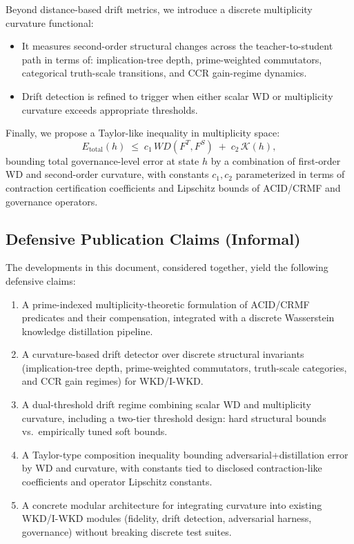 \documentclass[11pt]{article}
\theoremstyle{definition}
\theoremstyle{plain}
\theoremstyle{remark}
\begin{document}
Beyond distance-based drift metrics, we introduce a discrete multiplicity curvature functional:
\begin{itemize}[leftmargin=2em]
  \item It measures second-order structural changes across the teacher-to-student path in terms of: implication-tree depth, prime-weighted commutators, categorical truth-scale transitions, and CCR gain-regime dynamics.
  \item Drift detection is refined to trigger when either scalar WD or multiplicity curvature exceeds appropriate thresholds.
\end{itemize}

Finally, we propose a Taylor-like inequality in multiplicity space:
\[
  E_{\text{total}}(h) \;\le\; c_1 \, WD(F^T,F^S) \;+\; c_2 \, \mathcal{K}(h),
\]
bounding total governance-level error at state \(h\) by a combination of first-order WD and second-order curvature, with constants \(c_1,c_2\) parameterized in terms of contraction certification coefficients and Lipschitz bounds of ACID/CRMF and governance operators.

\subsection{Defensive Publication Claims (Informal)}

The developments in this document, considered together, yield the following defensive claims:
\begin{enumerate}[label=(C\arabic*), leftmargin=2em]
  \item A prime-indexed multiplicity-theoretic formulation of ACID/CRMF predicates and their compensation, integrated with a discrete Wasserstein knowledge distillation pipeline.
  \item A curvature-based drift detector over discrete structural invariants (implication-tree depth, prime-weighted commutators, truth-scale categories, and CCR gain regimes) for WKD/I-WKD.
  \item A dual-threshold drift regime combining scalar WD and multiplicity curvature, including a two-tier threshold design: hard structural bounds vs.\ empirically tuned soft bounds.
  \item A Taylor-type composition inequality bounding adversarial+distillation error by WD and curvature, with constants tied to disclosed contraction-like coefficients and operator Lipschitz constants.
  \item A concrete modular architecture for integrating curvature into existing WKD/I-WKD modules (fidelity, drift detection, adversarial harness, governance) without breaking discrete test suites.
\end{enumerate}
\end{document}
